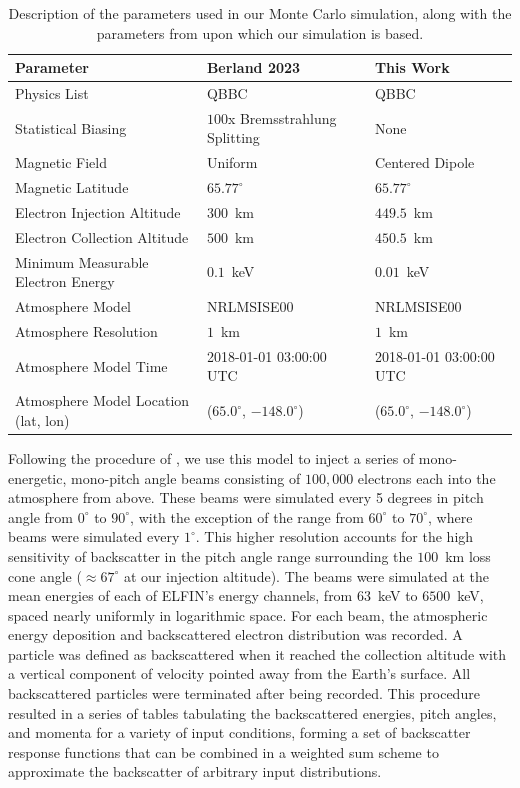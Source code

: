 \documentclass[draft]{agujournal2019}
\newcommand{\mathdeg}{^\circ}
\begin{document}
\begin{table}[]
  \centering
  \begin{tabular}{lll}
    \textbf{Parameter} & \textbf{Berland 2023} & \textbf{This Work} \\
    \hline
    Physics List & QBBC & QBBC \\
    Statistical Biasing &  $100$x Bremsstrahlung Splitting & None \\
    Magnetic Field & Uniform & Centered Dipole \\
    Magnetic Latitude & $65.77\mathdeg$ & $65.77\mathdeg$ \\
    Electron Injection Altitude & $300$~km & $449.5$~km \\
    Electron Collection Altitude & $500$~km & $450.5$~km \\
    Minimum Measurable Electron Energy & $0.1$~keV & $0.01$~keV \\
    Atmosphere Model & NRLMSISE00 & NRLMSISE00 \\
    Atmosphere Resolution & $1$~km & $1$~km \\
    Atmosphere Model Time & 2018-01-01 03:00:00 UTC & 2018-01-01 03:00:00 UTC \\
    Atmosphere Model Location (lat, lon) & ($65.0\mathdeg$, $-148.0\mathdeg$) & ($65.0\mathdeg$, $-148.0\mathdeg$)
  \end{tabular}
  \caption{
    Description of the parameters used in our Monte Carlo simulation, along with the parameters from  upon which our simulation is based.
  }
  \label{table:comparison}
\end{table}

Following the procedure of , we use this model to inject a series of mono-energetic, mono-pitch angle beams consisting of $100,000$ electrons each into the atmosphere from above. These beams were simulated every 5 degrees in pitch angle from $0\mathdeg$ to $90\mathdeg$, with the exception of the range from $60\mathdeg$ to $70\mathdeg$, where beams were simulated every $1\mathdeg$. This higher resolution accounts for the high sensitivity of backscatter in the pitch angle range surrounding the $100$~km loss cone angle ($\approx 67\mathdeg$ at our injection altitude). The beams were simulated at the mean energies of each of ELFIN's energy channels, from $63$~keV to $6500$~keV, spaced nearly uniformly in logarithmic space. For each beam, the atmospheric energy deposition and backscattered electron distribution was recorded. A particle was defined as backscattered when it reached the collection altitude with a vertical component of velocity pointed away from the Earth's surface. All backscattered particles were terminated after being recorded. This procedure resulted in a series of tables tabulating the backscattered energies, pitch angles, and momenta for a variety of input conditions, forming a set of backscatter response functions that can be combined in a weighted sum scheme to approximate the backscatter of arbitrary input distributions.
\end{document}
